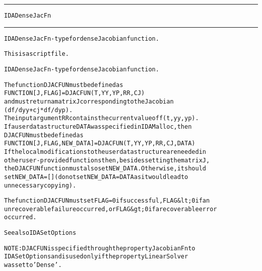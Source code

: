 \begin{samepage}
\hrule
\begin{center}
{\large \verb!IDADenseJacFn!}
\label{p:IDADenseJacFn}
\end{center}
\hrule\vspace{0.1in}



\begin{alltt}
IDADenseJacFn - type for dense Jacobian function.
\end{alltt}

\end{samepage}



\begin{samepage}


\begin{alltt}
This is a script file. 
\end{alltt}

\end{samepage}



\begin{alltt}
IDADenseJacFn - type for dense Jacobian function.

   The function DJACFUN must be defined as 
        FUNCTION [J, FLAG] = DJACFUN(T, YY, YP, RR, CJ)
   and must return a matrix J corresponding to the Jacobian 
   (df/dyy + cj*df/dyp).
   The input argument RR contains the current value of f(t,yy,yp).
   If a user data structure DATA was specified in IDAMalloc, then
   DJACFUN must be defined as
        FUNCTION [J, FLAG, NEW_DATA] = DJACFUN(T, YY, YP, RR, CJ, DATA)
   If the local modifications to the user data structure are needed in
   other user-provided functions then, besides setting the matrix J,
   the DJACFUN function must also set NEW_DATA. Otherwise, it should
   set NEW_DATA=[] (do not set NEW_DATA = DATA as it would lead to 
   unnecessary copying).

   The function DJACFUN must set FLAG=0 if successful, FLAG&lt;0 if an
   unrecoverable failure occurred, or FLAG&gt;0 if a recoverable error
   occurred.

   See also IDASetOptions

   NOTE: DJACFUN is specified through the property JacobianFn to
   IDASetOptions and is used only if the property LinearSolver
   was set to 'Dense'.
\end{alltt}






\vspace{0.1in}